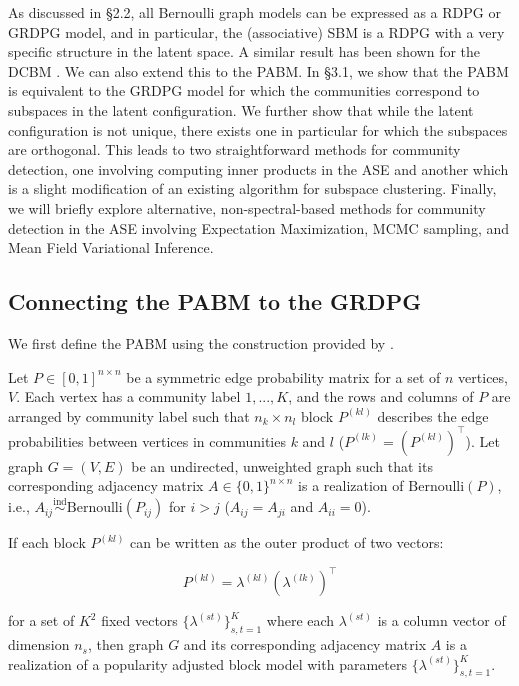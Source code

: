 \documentclass[
  11pt,
]{article}
\begin{document}
As discussed in \S 2.2, all Bernoulli graph models can be expressed as a
RDPG or GRDPG model, and in particular, the (associative) SBM is a RDPG
with a very specific structure in the latent space. A similar result has
been shown for the DCBM \cite{lyzinski2014}. We can also extend this to
the PABM. In \S 3.1, we show that the PABM is equivalent to the GRDPG
model for which the communities correspond to subspaces in the latent
configuration. We further show that while the latent configuration is
not unique, there exists one in particular for which the subspaces are
orthogonal. This leads to two straightforward methods for community
detection, one involving computing inner products in the ASE and another
which is a slight modification of an existing algorithm for subspace
clustering. Finally, we will briefly explore alternative,
non-spectral-based methods for community detection in the ASE involving
Expectation Maximization, MCMC sampling, and Mean Field Variational
Inference.

\hypertarget{connecting-the-pabm-to-the-grdpg}{%
\subsection{Connecting the PABM to the
GRDPG}\label{connecting-the-pabm-to-the-grdpg}}

We first define the PABM using the construction provided by
\citet{noroozi2019estimation}.

\begin{definition}
\label{pabm}
Let $P \in [0, 1]^{n \times n}$ be a symmetric edge probability matrix for a 
set of $n$ 
vertices, $V$. Each vertex has a community label $1, ..., K$, and the rows and 
columns of $P$ are arranged by community label such that $n_k \times n_l$ block 
$P^{(kl)}$ describes the edge probabilities between vertices in communities 
$k$ and $l$ ($P^{(lk)} = (P^{(kl)})^\top$). 
Let graph $G = (V, E)$ be an undirected, unweighted graph such 
that its corresponding adjacency matrix $A \in \{0, 1\}^{n \times n}$ is a 
realization of $\text{Bernoulli}(P)$, i.e., 
$A_{ij} \stackrel{\text{ind}}{\sim}\text{Bernoulli}(P_{ij})$ for $i > j$ 
($A_{ij} = A_{ji}$ and $A_{ii} = 0$). 

If each block $P^{(kl)}$ can be written as the outer product of two vectors:

\begin{equation} \label{eq:pabm}
  P^{(kl)} = \lambda^{(kl)} (\lambda^{(lk)})^\top
\end{equation}

for a set of $K^2$ fixed vectors $\{\lambda^{(st)}\}_{s, t = 1}^K$ where each 
$\lambda^{(st)}$ is a column vector 
of dimension $n_s$, then graph $G$ and its corresponding adjacency matrix $A$ 
is a realization of a popularity adjusted block model with parameters 
$\{\lambda^{(st)}\}_{s, t = 1}^K$. 
\end{definition}
\end{document}
